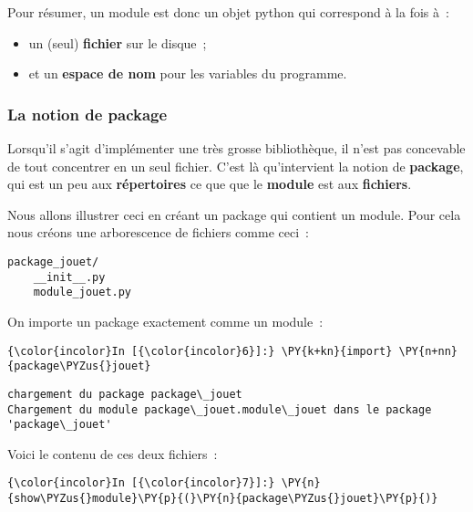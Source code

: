     Pour résumer, un module est donc un objet python qui correspond à la
fois à~:

\begin{itemize}
\tightlist
\item
  un (seul) \textbf{fichier} sur le disque~;
\item
  et un \textbf{espace de nom} pour les variables du programme.
\end{itemize}

    \hypertarget{la-notion-de-package}{%
\subsubsection{La notion de package}\label{la-notion-de-package}}

    Lorsqu'il s'agit d'implémenter une très grosse bibliothèque, il n'est
pas concevable de tout concentrer en un seul fichier. C'est là
qu'intervient la notion de \textbf{package}, qui est un peu aux
\textbf{répertoires} ce que que le \textbf{module} est aux
\textbf{fichiers}.

    Nous allons illustrer ceci en créant un package qui contient un module.
Pour cela nous créons une arborescence de fichiers comme ceci~:

\begin{verbatim}
package_jouet/
    __init__.py
    module_jouet.py
\end{verbatim}

    On importe un package exactement comme un module~:

    \begin{Verbatim}[commandchars=\\\{\}]
{\color{incolor}In [{\color{incolor}6}]:} \PY{k+kn}{import} \PY{n+nn}{package\PYZus{}jouet}
\end{Verbatim}


    \begin{Verbatim}[commandchars=\\\{\}]
chargement du package package\_jouet
Chargement du module package\_jouet.module\_jouet dans le package 'package\_jouet'

    \end{Verbatim}

    Voici le contenu de ces deux fichiers~:

    \begin{Verbatim}[commandchars=\\\{\}]
{\color{incolor}In [{\color{incolor}7}]:} \PY{n}{show\PYZus{}module}\PY{p}{(}\PY{n}{package\PYZus{}jouet}\PY{p}{)}
\end{Verbatim}


